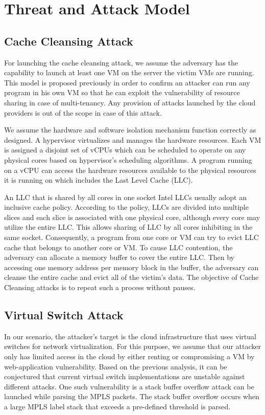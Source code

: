 \documentclass[a4paper,10pt]{article}
\begin{document}
\medskip

\section{Threat and Attack Model}

\subsection{Cache Cleansing Attack}
For launching the cache cleansing attack, we assume the adversary has the capability to launch at least one VM on the server the victim VMs are running. This model is proposed previously in order to confirm an attacker can run any program in his own VM so that he can exploit the vulnerability of resource sharing in case of multi-tenancy. Any provision of attacks launched by the cloud providers is out of the scope in case of this attack.

We assume the hardware and software isolation mechanism function correctly as designed. A hypervisor virtualizes and manages the hardware resources. Each VM is assigned a disjoint set of vCPUs which can be scheduled to operate on any physical cores based on hypervisor's scheduling algorithms. A program running on a vCPU can access the hardware resources available to the physical resources it is running on which includes the Last Level Cache (LLC).

An LLC that is shared by all cores in one socket Intel LLCs usually adopt an inclusive cache policy. According to the policy, LLCs are divided into multiple slices and each slice is associated with one physical core, although every core may utilize the entire LLC. This allows sharing of LLC by all cores inhibiting in the same socket. Consequently, a program from one core or VM can try to evict LLC cache that belongs to another core or VM. To cause LLC contention, the adversary can allocate a memory buffer to cover the entire LLC. Then by accessing one memory address per memory block in the buffer, the adversary can cleanse the entire cache and evict all of the victim's data. The objective of Cache Cleansing attacks is to repeat such a process without pauses.

\subsection{Virtual Switch Attack}
In our scenario, the attacker's target is the cloud infrastructure that uses virtual switches for network virtualization. For this purpose, we assume that our attacker only has limited access in the cloud by either renting or compromising a VM by web-application vulnerability. Based on the previous analysis, it can be conjectured that current virtual switch implementations are unstable against different attacks. One such vulnerability is a stack buffer overflow attack can be launched while parsing the MPLS packets. The stack buffer overflow occurs when a large MPLS label stack that exceeds a pre-defined threshold is parsed.
\end{document}
